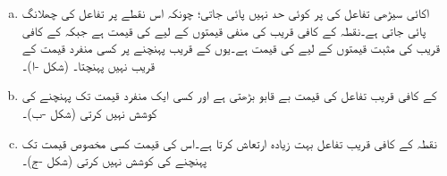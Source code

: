 \begin{enumerate}[a.]
\item
اکائی سیڑھی تفاعل  کی   پر کوئی حد نہیں پائی جاتی؛  چونکہ اس نقطے  پر تفاعل کی چھلانگ پائی جاتی ہے۔نقطہ  کے کافی قریب  کی منفی قیمتوں کے لیے  کی قیمت  ہے جبکہ  کے کافی  قریب    کی مثبت قیمتوں کے لیے  کی قیمت  ہے۔یوں  کے قریب پہنچنے پر  کسی منفرد قیمت کے قریب نہیں پہنچتا۔  (شکل -ا)۔
\item
{} کے کافی قریب تفاعل کی قیمت بے قابو بڑھتی ہے اور کسی ایک منفرد قیمت تک پہنچنے کی کوشش نہیں کرتی  (شکل -ب)۔
\item
نقطہ  کے کافی قریب تفاعل بہت زیادہ ارتعاش کرتا ہے۔اس کی قیمت کسی مخصوص قیمت تک پہنچنے کی کوشش نہیں کرتی  (شکل -ج)۔ 
\end{enumerate}
%
